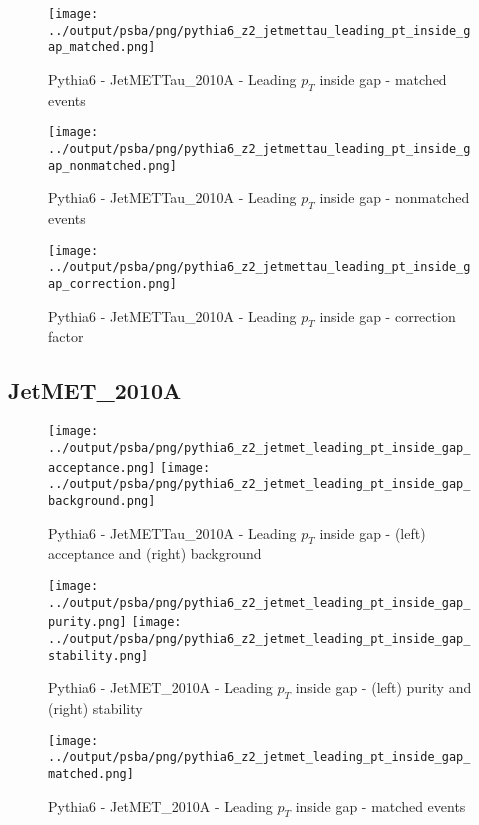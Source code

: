 \documentclass[11pt]{book}
\begin{document}
\begin{figure}[ht]
\centering
\texttt{[image: ../output/psba/png/pythia6\_z2\_jetmettau\_leading\_pt\_inside\_gap\_matched.png]}
\caption{Pythia6 - JetMETTau\_2010A - Leading $p_{T}$ inside gap - matched events}
\label{fig:p6_jetmettau_leading_pt_inside_gap_matched}
\end{figure}

\begin{figure}[ht]
\centering
\texttt{[image: ../output/psba/png/pythia6\_z2\_jetmettau\_leading\_pt\_inside\_gap\_nonmatched.png]}
\caption{Pythia6 - JetMETTau\_2010A - Leading $p_{T}$ inside gap - nonmatched events}
\label{fig:p6_jetmettau_leading_pt_inside_gap_nonmatched}
\end{figure}

\begin{figure}[ht]
\centering
\texttt{[image: ../output/psba/png/pythia6\_z2\_jetmettau\_leading\_pt\_inside\_gap\_correction.png]}
\caption{Pythia6 - JetMETTau\_2010A - Leading $p_{T}$ inside gap - correction factor}
\label{fig:p6_jetmettau_leading_pt_inside_gap_correction}
\end{figure}


\clearpage
\subsection{JetMET\_2010A}

\begin{figure}[ht]
\centering
\texttt{[image: ../output/psba/png/pythia6\_z2\_jetmet\_leading\_pt\_inside\_gap\_acceptance.png]}
\texttt{[image: ../output/psba/png/pythia6\_z2\_jetmet\_leading\_pt\_inside\_gap\_background.png]}
\caption{Pythia6 - JetMETTau\_2010A - Leading $p_{T}$ inside gap - (left) acceptance and (right) background}
\label{fig:p6_jetmettau_leading_pt_inside_gap_ab}
\end{figure}

\begin{figure}[ht]
\centering
\texttt{[image: ../output/psba/png/pythia6\_z2\_jetmet\_leading\_pt\_inside\_gap\_purity.png]}
\texttt{[image: ../output/psba/png/pythia6\_z2\_jetmet\_leading\_pt\_inside\_gap\_stability.png]}
\caption{Pythia6 - JetMET\_2010A - Leading $p_{T}$ inside gap - (left) purity and (right) stability}
\label{fig:p6_jetmet_leading_pt_inside_gap_ps}
\end{figure}

\begin{figure}[ht]
\centering
\texttt{[image: ../output/psba/png/pythia6\_z2\_jetmet\_leading\_pt\_inside\_gap\_matched.png]}
\caption{Pythia6 - JetMET\_2010A - Leading $p_{T}$ inside gap - matched events}
\label{fig:p6_jetmet_leading_pt_inside_gap_matched}
\end{figure}
\end{document}
